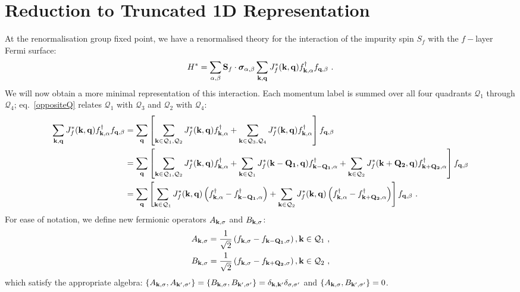 \documentclass[%
reprint,
superscriptaddress,
groupedaddress,
superscriptaddress,
onecolumn,
]{revtex4-2}
\begin{document}
\section{Reduction to Truncated 1D Representation}
At the renormalisation group fixed point, we have a renormalised theory for the interaction of the impurity spin \(S_f\) with the \(f-\)layer Fermi surface:
\begin{equation}\begin{aligned}
	H^* = \sum_{\alpha,\beta}{\bf S}_f\cdot{\boldsymbol\sigma}_{\alpha,\beta}\sum_{{\bf k}, {\bf q}} J_f^*({\bf k},{\bf q}) f^\dagger_{{\bf k},\alpha}f_{{\bf q},\beta}~.
\end{aligned}\end{equation}
We will now obtain a more minimal representation of this interaction. Each momentum label is summed over all four quadrants \(\mathcal{Q}_1\) through \(\mathcal{Q}_4\); eq.~\ref{oppositeQ} relates \(\mathcal{Q}_1\) with \(\mathcal{Q}_3\) and \(\mathcal{Q}_2\) with \(\mathcal{Q}_4\):
\begin{equation}\begin{aligned}
	\sum_{{\bf k}, {\bf q}} J_f^*({\bf k},{\bf q}) f^\dagger_{{\bf k},\alpha}f_{{\bf q},\beta} 
	&= \sum_{\bf q}\left[\sum_{{\bf k} \in \mathcal{Q}_1,\mathcal{Q}_2} J_f^*({\bf k},{\bf q}) f^\dagger_{{\bf k},\alpha} + \sum_{{\bf k} \in \mathcal{Q}_3,\mathcal{Q}_4} J_f^*({\bf k},{\bf q}) f^\dagger_{{\bf k},\alpha}\right] f_{{\bf q},\beta}\\
	&= \sum_{\bf q}\left[\sum_{{\bf k} \in \mathcal{Q}_1,\mathcal{Q}_2} J_f^*({\bf k},{\bf q}) f^\dagger_{{\bf k},\alpha} + \sum_{{\bf k} \in \mathcal{Q}_1} J_f^*({\bf k - Q_1},{\bf q}) f^\dagger_{{\bf k - Q_1},\alpha} + \sum_{{\bf k} \in \mathcal{Q}_2} J_f^*({\bf k + Q_2},{\bf q}) f^\dagger_{{\bf k + Q_2},\alpha}\right] f_{{\bf q},\beta}\\
	&= \sum_{\bf q}\left[\sum_{{\bf k} \in \mathcal{Q}_1} J_f^*({\bf k},{\bf q}) \left(f^\dagger_{{\bf k},\alpha} - f^\dagger_{{\bf k - Q_1},\alpha}\right) + \sum_{{\bf k} \in \mathcal{Q}_2} J_f^*({\bf k},{\bf q}) \left(f^\dagger_{{\bf k},\alpha} - f^\dagger_{{\bf k + Q_2},\alpha}\right) \right] f_{{\bf q},\beta}~.
\end{aligned}\end{equation}
For ease of notation, we define new fermionic operators \(A_{{\bf k},\sigma}\) and \(B_{{\bf k},\sigma}\):
\begin{equation}\begin{aligned}
	A_{{\bf k},\sigma} = \frac{1}{\sqrt{2}}\left(f_{{\bf k},\sigma} - f_{{\bf k - Q_1},\sigma}\right), {\bf k}\in\mathcal{Q}_1~,\\
	B_{{\bf k},\sigma} = \frac{1}{\sqrt{2}}\left(f_{{\bf k},\sigma} - f_{{\bf k + Q_2},\sigma}\right), {\bf k}\in\mathcal{Q}_2~,
\end{aligned}\end{equation}
which satisfy the appropriate algebra: \(\left\{A_{{\bf k},\sigma}, A_{{\bf k}^\prime,\sigma^\prime}\right\} = \left\{B_{{\bf k},\sigma}, B_{{\bf k}^\prime,\sigma^\prime}\right\} = \delta_{{\bf k},{\bf k}^\prime}\delta_{\sigma,\sigma^\prime}\) and \(\left\{A_{{\bf k},\sigma}, B_{{\bf k}^\prime,\sigma^\prime}\right\} = 0\).
\end{document}
